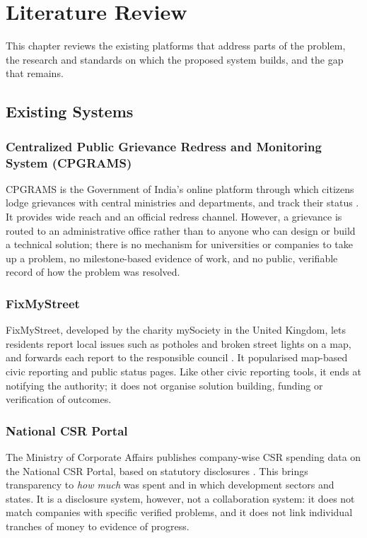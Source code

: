 \chapter{Literature Review}

This chapter reviews the existing platforms that address parts of the problem, the research and standards on which the proposed system builds, and the gap that remains.

\section{Existing Systems}

\subsection*{Centralized Public Grievance Redress and Monitoring System (CPGRAMS)}
CPGRAMS is the Government of India's online platform through which citizens lodge grievances with central ministries and departments, and track their status \cite{cpgrams}. It provides wide reach and an official redress channel. However, a grievance is routed to an administrative office rather than to anyone who can design or build a technical solution; there is no mechanism for universities or companies to take up a problem, no milestone-based evidence of work, and no public, verifiable record of how the problem was resolved.

\subsection*{FixMyStreet}
FixMyStreet, developed by the charity mySociety in the United Kingdom, lets residents report local issues such as potholes and broken street lights on a map, and forwards each report to the responsible council \cite{fixmystreet}. It popularised map-based civic reporting and public status pages. Like other civic reporting tools, it ends at notifying the authority; it does not organise solution building, funding or verification of outcomes.

\subsection*{National CSR Portal}
The Ministry of Corporate Affairs publishes company-wise CSR spending data on the National CSR Portal, based on statutory disclosures \cite{csrportal}. This brings transparency to \emph{how much} was spent and in which development sectors and states. It is a disclosure system, however, not a collaboration system: it does not match companies with specific verified problems, and it does not link individual tranches of money to evidence of progress.

